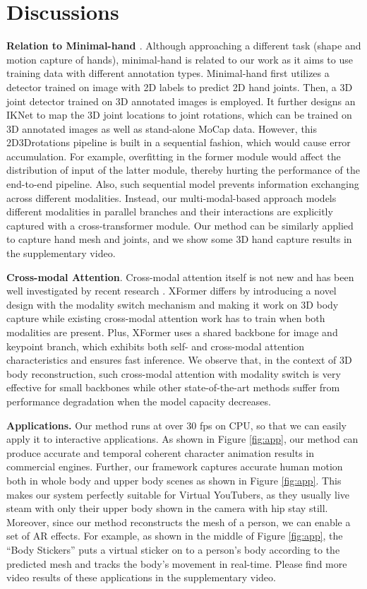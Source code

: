 \documentclass{article}
\newcommand\mypara[1]{\noindent\textbf{#1}}
\begin{document}
\section{Discussions}

\mypara{Relation to Minimal-hand \cite{zhou2020monocular}}. 
Although approaching a different task (shape and motion capture of hands), minimal-hand \cite{zhou2020monocular} is related to our work as it aims to use training data with different annotation types. Minimal-hand first utilizes a detector trained on image with 2D labels to predict 2D hand joints. Then, a 3D joint detector trained on 3D annotated images is employed. It further designs an IKNet to map the 3D joint locations to joint rotations, which can be trained on 3D annotated images as well as stand-alone MoCap data. However, this 2D3Drotations pipeline is built in a sequential fashion, which would cause error accumulation. For example, overfitting in the former module would affect the distribution of input of the latter module, thereby hurting the performance of the end-to-end pipeline. Also, such sequential model prevents information exchanging across different modalities. Instead, our multi-modal-based approach models different modalities in parallel branches and their interactions are explicitly captured with a cross-transformer module. Our method can be similarly applied to capture hand mesh and joints, and we show some 3D hand capture results in the supplementary video.

\mypara{Cross-modal Attention}. Cross-modal attention itself is not new and has been well investigated by recent research \cite{lu2019vilbert,chen2021cascade,wei2020multi,ye2019cross}. XFormer differs by introducing a novel design with the modality switch mechanism and making it work on 3D body capture while existing cross-modal attention work has to train when both modalities are present. Plus, XFormer uses a shared backbone for image and keypoint branch, which exhibits both self- and cross-modal attention characteristics and ensures fast inference. We observe that, in the context of 3D body reconstruction, such cross-modal attention with modality switch is very effective for small backbones while other state-of-the-art methods \cite{lin2021-mesh-graphormer,kocabas2021pare} suffer from performance degradation when the model capacity decreases.

\mypara{Applications.} 
Our method runs at over 30 fps on CPU, so that we can easily apply it to interactive applications. 
As shown in Figure \ref{fig:app}, our method can produce accurate and temporal coherent character animation results in commercial engines. 
Further, our framework captures accurate human motion both in whole body and upper body scenes as shown in Figure \ref{fig:app}. This makes our system perfectly suitable for Virtual YouTubers, as they usually live steam with only their upper body shown in the camera with hip stay still.
Moreover, since our method reconstructs the mesh of a person, we can enable a set of AR effects. For example, as shown in the middle of Figure \ref{fig:app}, the ``Body Stickers'' puts a virtual sticker on to a person's body according to the predicted mesh and tracks the body's movement in real-time. Please find more video results of these applications in the supplementary video.
\end{document}
